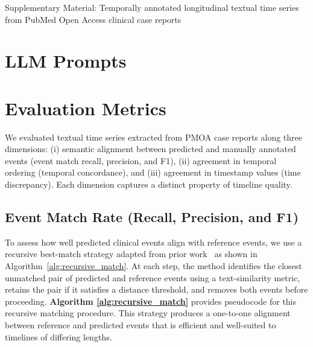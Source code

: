 \begin{center}
    {\LARGE Supplementary Material: Temporally annotated longitudinal textual time series from PubMed Open Access clinical case reports}
\end{center}
\vspace{1em} 


\section{LLM Prompts}
\label{apd:llm-prompts}


\clearpage


\clearpage




\clearpage
\section{Evaluation Metrics}
\label{apd:evaluation-metrics}

We evaluated textual time series extracted from PMOA case reports along three dimensions:
(i) semantic alignment between predicted and manually annotated events (event match recall, precision, and F1),
(ii) agreement in temporal ordering (temporal concordance), and
(iii) agreement in timestamp values (time discrepancy).
Each dimension captures a distinct property of timeline quality.

\subsection{Event Match Rate (Recall, Precision, and F1)}
\label{apd:event-match-rate}

To assess how well predicted clinical events align with reference events, we use a recursive
best-match strategy adapted from prior work~\cite{wang2025large} as shown in Algorithm~\ref{alg:recursive_match}. At each step, the method
identifies the closest unmatched pair of predicted and reference events using a text-similarity
metric, retains the pair if it satisfies a distance threshold, and removes both events before
proceeding. \textbf{Algorithm \ref{alg:recursive_match}} provides pseudocode for this recursive matching procedure.
This strategy produces a one-to-one alignment between reference and predicted events that is
efficient and well-suited to timelines of differing lengths. 

